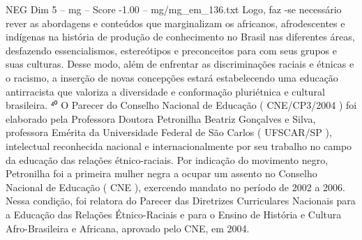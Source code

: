 \begin{textsample}{NEG Dim 5 – mg – Score -1.00 – mg/mg\_em\_136.txt}
Logo, faz -se necessário rever as abordagens e conteúdos que marginalizam os africanos, afrodescentes e indígenas na história de produção de conhecimento no Brasil nas diferentes áreas, desfazendo essencialismos, estereótipos e preconceitos para com seus grupos e suas culturas.
Desse modo, além de enfrentar as discriminações raciais e étnicas e o racismo, a inserção de novas concepções estará estabelecendo uma educação antirracista que valoriza a diversidade e conformação pluriétnica e cultural brasileira. ⁴⁰ O Parecer do Conselho Nacional de Educação ( CNE/CP3/2004 ) foi elaborado pela Professora Doutora Petronilha Beatriz Gonçalves e Silva, professora Emérita da Universidade Federal de São Carlos ( UFSCAR/SP ), intelectual reconhecida nacional e internacionalmente por seu trabalho no campo da educação das relações étnico-raciais.
Por indicação do movimento negro, Petronilha foi a primeira mulher negra a ocupar um assento no Conselho Nacional de Educação ( CNE ), exercendo mandato no período de 2002 a 2006.
Nessa condição, foi relatora do Parecer das Diretrizes Curriculares Nacionais para a Educação das Relações Étnico-Raciais e para o Ensino de História e Cultura Afro-Brasileira e Africana, aprovado pelo CNE, em 2004.

\end{textsample}
